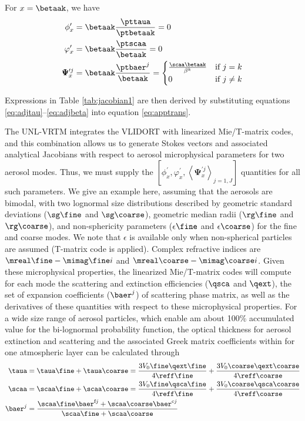 For $x=\betaak$, we have
\begingroup
\allowdisplaybreaks
\begin{align}
\phi_x^\prime &= \betaak\frac{\pttaua}{\ptbetaak}=0  \\
\varphi_x^\prime &= \betaak\frac{\ptscaa}{\betaak}=0 \\
\pmb{\Psi}_x^{\prime j} &= \betaak\frac{\ptbaer^j}{\betaak} = 
\begin{cases}
 \frac{\scaa\betaak}{\beta^k} & \mbox{if $j=k$} \\
 0 & \mbox{if $j\neq k$}
\end{cases}
\label{eq:adjbeta}
\end{align}
\endgroup

Expressions in Table \ref{tab:jacobian1} are then derived by substituting 
equations \eqref{eq:adjtau}--\eqref{eq:adjbeta} into equation
\eqref{eq:apptrans}.

The UNL-VRTM integrates the VLIDORT with linearized Mie/T-matrix codes, and
this combination allows us to generate Stokes vectors and associated analytical
Jacobians with respect to aerosol microphysical parameters for two aerosol
modes. Thus, we must supply the 
$\left[ \phi_x^\prime, \varphi_x^\prime, \left<\pmb{\Psi}_x^{\prime j}\right>_{j=1,J}\right]$
quantities for all such parameters. 
We give an example here, assuming that the aerosols are bimodal,
with two lognormal size distributions described by geometric standard
deviations ($\sg\fine$ and $\sg\coarse$), geometric median radii 
($\rg\fine$ and $\rg\coarse$), and non-sphericity parameters ($\epsilon\fine$ and
$\epsilon\coarse$) for the fine and coarse modes. We note
that $\epsilon$ is available only when non-spherical particles are assumed 
(T-matrix code is applied). Complex refractive indices are 
$\mreal\fine-\mimag\fine i$ and $\mreal\coarse-\mimag\coarse i$. Given
these microphysical properties, the linearized Mie/T-matrix codes will compute
for each mode the scattering and extinction efficiencies ($\qsca$ and $\qext$), 
the set of expansion coefficients ($\baer^j$) of scattering phase matrix, 
as well as the derivatives of these quantities with respect to these 
microphysical properties. For a wide size range of aerosol particles, 
which enable am about 100\% accumulated
value for the bi-lognormal probability function, the optical thickness for
aerosol extinction and scattering and the associated Greek matrix coefficients
within for one atmospheric layer can be calculated through
\begingroup
\allowdisplaybreaks
\begin{align}
\taua &= \taua\fine + \taua\coarse 
       = \frac{3V_0\fine\qext\fine}{4\reff\fine} +
         \frac{3V_0\coarse\qext\coarse}{4\reff\coarse} \label{eq:apptau} \\
\scaa &= \scaa\fine + \scaa\coarse 
       = \frac{3V_0\fine\qsca\fine}{4\reff\fine} + 
         \frac{3V_0\coarse\qsca\coarse}{4\reff\coarse} \\
\baer^j &= \frac{\scaa\fine\baer^{\text{f}j}+\scaa\coarse\baer^{\text{c}j}}
                {\scaa\fine + \scaa\coarse} \label{eq:appbaer}
\end{align}
\endgroup

